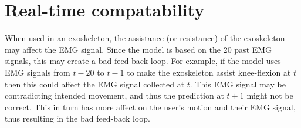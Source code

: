 \documentclass[../main.tex]{subfiles}
\begin{document}
\section{Real-time compatability}
\label{sec:discussion_real-time}
When used in an exoskeleton, the assistance (or resistance) of the exoskeleton may affect the \ac{EMG} signal.
Since the model is based on the 20 past \ac{EMG} signals, this may create a bad feed-back loop.
For example, if the model uses \ac{EMG} signals from $t-20$ to $t-1$ to make the exoskeleton assist knee-flexion at $t$ then this could affect the \ac{EMG} signal collected at $t$.
This \ac{EMG} signal may be contradicting intended movement, and thus the prediction at $t+1$ might not be correct.
This in turn has more affect on the user's motion and their \ac{EMG} signal, thus resulting in the bad feed-back loop.
\end{document}

